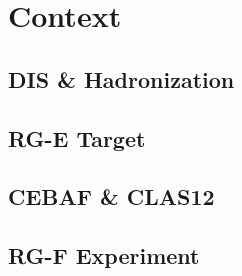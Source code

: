\section{Context}
\begin{frame}{}
    \centering \Huge{}
\end{frame}

\subsection{DIS \& Hadronization}


\subsection{RG-E Target}


\subsection{CEBAF \& CLAS12}


\subsection{RG-F Experiment}

